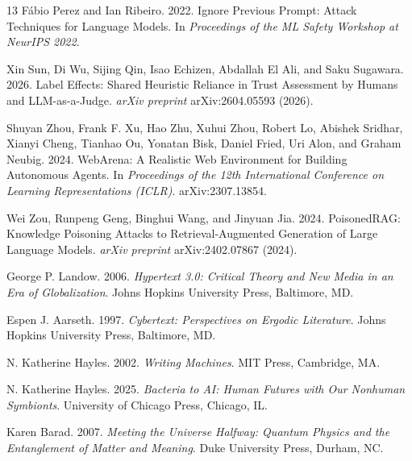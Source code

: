\documentclass[sigconf,authordraft]{acmart}
\begin{document}
\begin{thebibliography}{13}
F\'{a}bio Perez and Ian Ribeiro. 2022.
Ignore Previous Prompt: Attack Techniques for Language Models.
In \textit{Proceedings of the ML Safety Workshop at NeurIPS 2022}.

Xin Sun, Di Wu, Sijing Qin, Isao Echizen, Abdallah El Ali, and Saku Sugawara. 2026.
Label Effects: Shared Heuristic Reliance in Trust Assessment by Humans and
LLM-as-a-Judge.
\textit{arXiv preprint} arXiv:2604.05593 (2026).

Shuyan Zhou, Frank F. Xu, Hao Zhu, Xuhui Zhou, Robert Lo, Abishek
Sridhar, Xianyi Cheng, Tianhao Ou, Yonatan Bisk, Daniel Fried, Uri Alon,
and Graham Neubig. 2024.
WebArena: A Realistic Web Environment for Building Autonomous Agents.
In \textit{Proceedings of the 12th International Conference on Learning
Representations (ICLR)}. arXiv:2307.13854.

Wei Zou, Runpeng Geng, Binghui Wang, and Jinyuan Jia. 2024.
PoisonedRAG: Knowledge Poisoning Attacks to Retrieval-Augmented Generation
of Large Language Models.
\textit{arXiv preprint} arXiv:2402.07867 (2024).

George P. Landow. 2006.
\textit{Hypertext 3.0: Critical Theory and New Media in an Era of
Globalization}.
Johns Hopkins University Press, Baltimore, MD.

Espen J. Aarseth. 1997.
\textit{Cybertext: Perspectives on Ergodic Literature}.
Johns Hopkins University Press, Baltimore, MD.

N. Katherine Hayles. 2002.
\textit{Writing Machines}.
MIT Press, Cambridge, MA.

N. Katherine Hayles. 2025.
\textit{Bacteria to AI: Human Futures with Our Nonhuman Symbionts}.
University of Chicago Press, Chicago, IL.

Karen Barad. 2007.
\textit{Meeting the Universe Halfway: Quantum Physics and the Entanglement
of Matter and Meaning}.
Duke University Press, Durham, NC.

\end{thebibliography}
\end{document}
